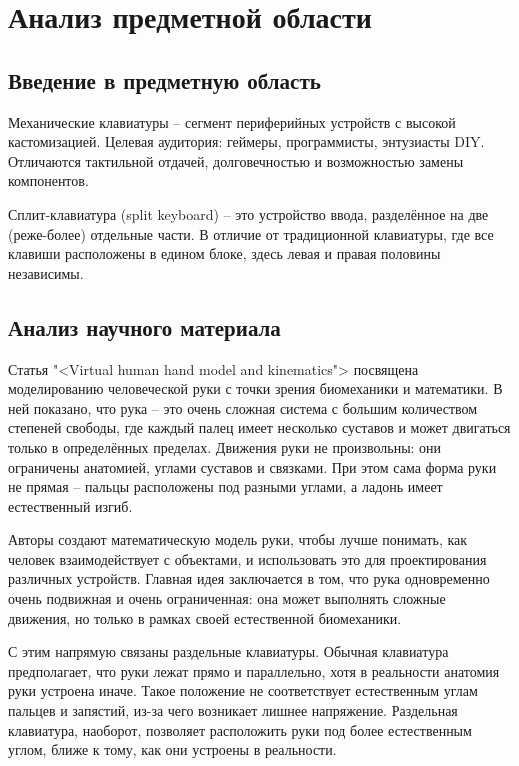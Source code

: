 \section{Анализ предметной области}

\subsection{Введение в предметную область}

Механические клавиатуры -- сегмент периферийных устройств с высокой кастомизацией. Целевая аудитория: геймеры, программисты, энтузиасты DIY. Отличаются тактильной отдачей, долговечностью и возможностью замены компонентов.

Сплит-клавиатура (split keyboard) -- это устройство ввода, разделённое на две (реже-более) отдельные части. В отличие от традиционной клавиатуры, где все клавиши расположены в едином блоке, здесь левая и правая половины независимы.

\subsection{Анализ научного материала}

Статья "<Virtual human hand model and kinematics"> посвящена моделированию человеческой руки с точки зрения биомеханики и математики. В ней показано, что рука -- это очень сложная система с большим количеством степеней свободы, где каждый палец имеет несколько суставов и может двигаться только в определённых пределах. Движения руки не произвольны: они ограничены анатомией, углами суставов и связками. При этом сама форма руки не прямая -- пальцы расположены под разными углами, а ладонь имеет естественный изгиб.

Авторы создают математическую модель руки, чтобы лучше понимать, как человек взаимодействует с объектами, и использовать это для проектирования различных устройств. Главная идея заключается в том, что рука одновременно очень подвижная и очень ограниченная: она может выполнять сложные движения, но только в рамках своей естественной биомеханики.

С этим напрямую связаны раздельные клавиатуры. Обычная клавиатура предполагает, что руки лежат прямо и параллельно, хотя в реальности анатомия руки устроена иначе. Такое положение не соответствует естественным углам пальцев и запястий, из-за чего возникает лишнее напряжение. Раздельная клавиатура, наоборот, позволяет расположить руки под более естественным углом, ближе к тому, как они устроены в реальности.

